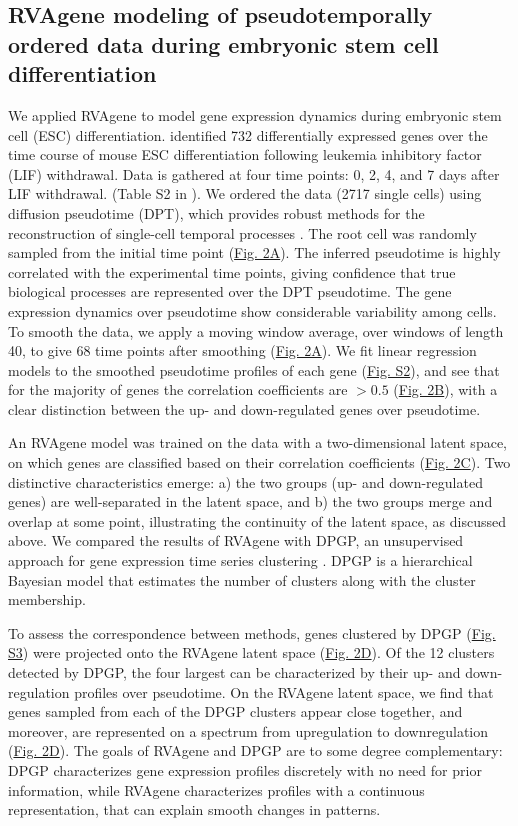 \subsection{RVAgene modeling of pseudotemporally ordered data during embryonic stem cell differentiation}

We applied RVAgene to model gene expression dynamics during embryonic stem cell (ESC) differentiation. \citet{Klein2015} identified 732 differentially expressed genes over the time course of mouse ESC differentiation following leukemia inhibitory factor (LIF) withdrawal. Data is gathered at four time points: 0, 2, 4, and 7 days after LIF withdrawal. (Table S2 in \citet{Klein2015}). We ordered the data (2717 single cells) using diffusion pseudotime (DPT), which provides robust methods for the reconstruction of single-cell temporal processes \citep{haghverdi2016diffusion}. The root cell was randomly sampled from the initial time point (\hyperref[fig:fig3]{Fig. 2A}). The inferred pseudotime is highly correlated with the experimental time points, giving confidence that true biological processes are represented over the DPT pseudotime. The gene expression dynamics over pseudotime show considerable variability among cells. To smooth the data, we apply a moving window average, over windows of length 40, to give 68 time points after smoothing (\hyperref[fig:fig3]{Fig. 2A}). 
We fit linear regression models to the smoothed pseudotime profiles of each gene (\hyperref[supp]{Fig. S2}), and see that for the majority of genes the correlation coefficients are $> 0.5$ (\hyperref[fig:fig3]{Fig. 2B}), with a clear distinction between the up- and down-regulated genes over pseudotime.
\par 
An RVAgene model was trained on the data with a two-dimensional latent space, on which genes are classified based on their correlation coefficients  (\hyperref[fig:fig3]{Fig. 2C}). Two distinctive characteristics emerge: a) the two groups (up- and down-regulated genes) are well-separated in the latent space, and b) the two groups merge and overlap at some point, illustrating the continuity of the latent space, as discussed above. 
We compared the results of RVAgene with DPGP, an unsupervised approach for gene expression time series clustering \citep{McDowell2018}. DPGP is a hierarchical Bayesian model that estimates the number of clusters along with the cluster membership.

To assess the correspondence between methods, genes clustered by DPGP (\hyperref[supp]{Fig. S3}) were projected onto the RVAgene latent space (\hyperref[fig:fig3]{Fig. 2D}). Of the 12 clusters detected by DPGP, the four largest can be characterized by their up- and down-regulation profiles over pseudotime. On the RVAgene latent space, we find that genes sampled from each of the DPGP clusters appear close together, and moreover, are represented on a spectrum from upregulation to downregulation (\hyperref[fig:fig3]{Fig. 2D}). The goals of RVAgene and DPGP are to some degree complementary: DPGP characterizes gene expression profiles discretely with no need for prior information, while RVAgene characterizes profiles with a continuous representation, that can explain smooth changes in patterns.

